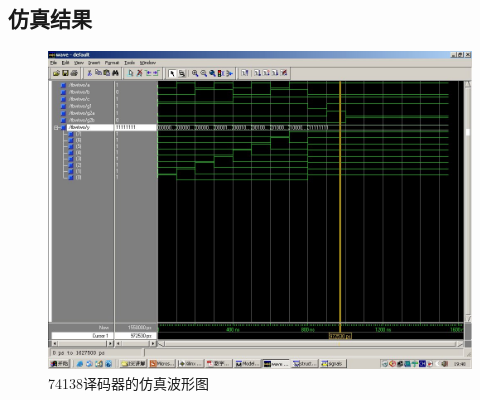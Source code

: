 \documentclass{article}
\begin{document}
\begin{CJK*}{UTF8}{gbsn}
\section{仿真结果}
\begin{center}
\begin{figure}[h!]
\includegraphics[width=\textwidth]{3.jpg}
\caption{74138译码器的仿真波形图}
\label{fig: cfig}
\end{figure}
\end{center}

\end{CJK*}
\end{document}
